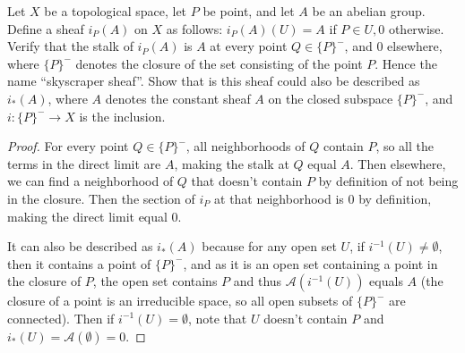 \begin{exercise} %
	Let $X $ be a topological space, let $P $ be point, and let $A $ be an abelian group. Define a sheaf $i_P(A) $ on $X $ as follows: $i_P(A)(U) = A $ if $P \in U, 0 $ otherwise. Verify that the stalk of $i_P(A) $ is $A $ at every point $Q \in \{P\} ^-   $, and $0 $ elsewhere, where $\{P\} ^-  $ denotes the closure of the set consisting of the point $P $. Hence the name ``skyscraper sheaf''. Show that is this sheaf could also be described as $i_\ast(A) $, where $A $ denotes the constant sheaf $A $ on the closed subspace $\{P\} ^-  $, and $i: \{P\} ^- \to X  $ is the inclusion.
\end{exercise}
\begin{proof}
	For every point $Q \in \{P\} ^-  $, all neighborhoods of $Q $ contain $P $, so all the terms in the direct limit are $A $, making the stalk at $Q $ equal $A $.
	Then elsewhere, we can find a neighborhood of $Q $ that doesn't contain $P $ by definition of not being in the closure.
	Then the section of $i_P $ at that neighborhood is 0 by definition, making the direct limit equal 0.

	It can also be described as $i_\ast(A) $ because for any open set $U $, if $i^{-1}(U) \ne \emptyset $, then it contains a point of $\{P\} ^-  $, and as it is an open set containing a point in the closure of $P $, the open set contains $P $ and thus $\mathscr{A}(i^{-1}(U)) $ equals $A $ (the closure of a point is an irreducible space, so all open subsets of $\{P\} ^-  $ are connected).
	Then if $i^{-1}(U) = \emptyset $, note that $U $ doesn't contain $P $ and $i_\ast(U) = \mathscr{A}(\emptyset) = 0 $.
\end{proof}

